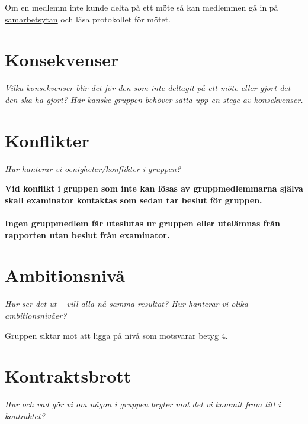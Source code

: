 Om en medlemm inte kunde delta på ett möte så kan medlemmen gå in på \href{https://github.com/anhility/DVA227}{samarbetsytan} och läsa protokollet för mötet. 

\section*{Konsekvenser}
\textit{Vilka konsekvenser blir det för den som inte deltagit på ett möte eller gjort det den ska ha gjort? Här kanske gruppen behöver sätta upp en stege av konsekvenser.}

\section*{Konflikter}
\textit{Hur hanterar vi oenigheter/konflikter i gruppen?}

\textbf{Vid konflikt i gruppen som inte kan lösas av gruppmedlemmarna själva skall examinator kontaktas som sedan tar beslut för gruppen. \\ \\
Ingen gruppmedlem får uteslutas ur gruppen eller utelämnas från rapporten utan beslut från examinator.}

\section*{Ambitionsnivå}
\textit{Hur ser det ut – vill alla nå samma resultat? Hur hanterar vi olika ambitionsnivåer?}

Gruppen siktar mot att ligga på nivå som motsvarar betyg 4.

\section*{Kontraktsbrott}
\textit{Hur och vad gör vi om någon i gruppen bryter mot det vi kommit fram till i kontraktet?}

